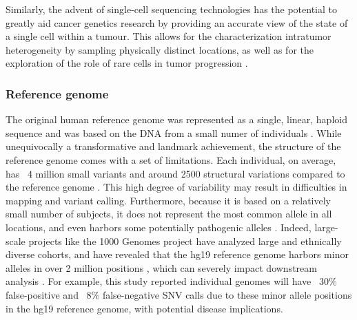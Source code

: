 Similarly, the advent of single-cell sequencing technologies has the potential to greatly aid cancer genetics research by providing an accurate view of the state of a single cell within a tumour. This allows for the characterization intratumor heterogeneity by sampling physically distinct locations, as well as for the exploration of the role of rare cells in tumor progression \cite{navin2015first}.

\subsubsection{Reference genome}
The original human reference genome was represented as a single, linear, haploid sequence and was based on the DNA from a small numer of individuals \cite{venter2001sequence}.
While unequivocally a transformative and landmark achievement, the structure of the reference genome comes with a set of limitations. Each individual, on average, has ~4 million small variants and around 2500 structural variations compared to the reference genome \cite{10002015global, sudmant2015integrated}.
This high degree of variability may result in difficulties in mapping and variant calling. Furthermore, because it is based on a relatively small number of subjects, it does not represent the most common allele in all locations, and even harbors some potentially pathogenic alleles \cite{barbitoff2018catching,koko2018challenges,ferrarini2015use}.
Indeed, large-scale projects like the 1000 Genomes project \cite{10002010map} have analyzed large and ethnically diverse cohorts, and have revealed that the hg19 reference genome harbors minor alleles in over 2 million positions \cite{10002015global}, which can severely impact downstream analysis \cite{karthikeyan2017hg19k}.
For example, this study reported individual genomes will have ~30\% false-positive and ~8\% false-negative SNV calls due to these minor allele positions in the hg19 reference genome, with potential disease implications.

